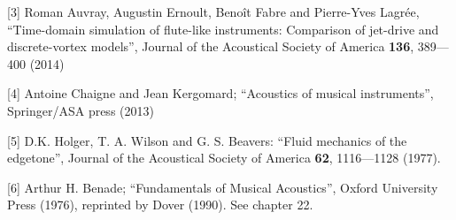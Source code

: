   [3] Roman Auvray, Augustin Ernoult, Benoît Fabre and Pierre-Yves Lagrée, 
  “Time-domain simulation of flute-like instruments: Comparison of jet-drive 
  and discrete-vortex models”, Journal of the Acoustical Society of America 
  \textbf{136}, 389—400 (2014) 

  [4] Antoine Chaigne and Jean Kergomard; “Acoustics of musical instruments”, 
  Springer/ASA press (2013) 

  [5] D.K. Holger, T. A. Wilson and G. S. Beavers: “Fluid mechanics of the 
  edgetone'', Journal of the Acoustical Society of America \textbf{62}, 
  1116—1128 (1977). 

  [6] Arthur H. Benade; “Fundamentals of Musical Acoustics”, Oxford University 
  Press (1976), reprinted by Dover (1990). See chapter 22. 